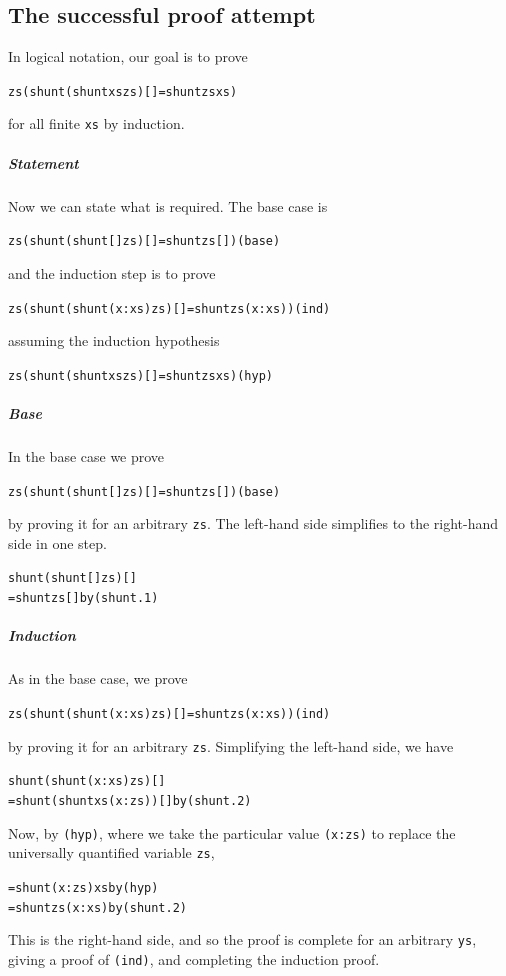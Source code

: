 \subsection*{The successful proof attempt} 

In logical notation, our goal is to prove
\begin{alltt}
\all{}zs (shunt (shunt xs zs) [] = shunt zs xs)
\end{alltt}
\index{\forall@$\forall$}
for all finite \texttt{xs} by induction.

\subparagraph*{Statement} Now we can state what is required. The base case is
\begin{alltt}
\all{}zs (shunt (shunt [] zs) [] = shunt zs []) \hfill (base)
\end{alltt}
and the induction step is to prove
\begin{alltt}
\all{}zs (shunt (shunt (x:xs) zs) [] = shunt zs (x:xs)) \hfill (ind)
\end{alltt}
assuming the induction hypothesis
\begin{alltt}
\all{}zs (shunt (shunt xs zs) [] = shunt zs xs) \hfill (hyp)
\end{alltt}

\subparagraph*{Base} In the base case we prove 
\begin{alltt}
\all{}zs (shunt (shunt [] zs) [] = shunt zs []) \hfill (base)
\end{alltt}
by proving it for an arbitrary \texttt{zs}. 
The left-hand side simplifies 
to the right-hand side in one step.
\begin{alltt}
shunt (shunt [] zs) []
  = shunt zs [] \hfill {\rm by} (shunt.1)
\end{alltt}

\subparagraph*{Induction} 
As in the base case, we prove  
\begin{alltt}
\all{}zs (shunt (shunt (x:xs) zs) [] = shunt zs (x:xs)) \hfill (ind)
\end{alltt}
by proving it for an arbitrary \texttt{zs}. Simplifying the left-hand side, we
have
\begin{alltt}
shunt (shunt (x:xs) zs) [] 
  = shunt (shunt xs (x:zs)) [] \hfill {\rm by} (shunt.2)
\end{alltt}
Now, by \texttt{(hyp)}, where we take the particular value \texttt{(x:zs)} to replace the
universally quantified variable \texttt{zs},
\begin{alltt}
  = shunt (x:zs) xs \hfill {\rm by} (hyp)
  = shunt zs (x:xs) \hfill {\rm by} (shunt.2)
\end{alltt}
This is the right-hand side, and so the proof is complete for an arbitrary
\texttt{ys}, giving a proof of \texttt{(ind)}, and completing the induction proof.
\blackbox

